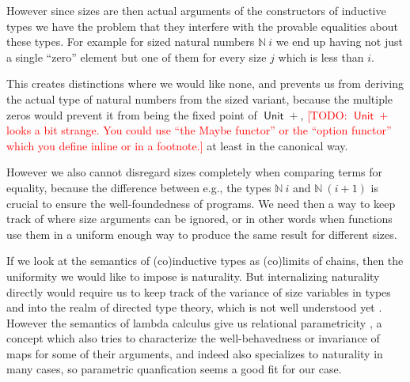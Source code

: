\documentclass{book}
\newcommand{\TODO}[1]{\textcolor{red}{[TODO: #1]}}
\DeclareMathOperator{\Unit}{\mathsf{Unit}}
\newcommand{\sNat}{\mathbb{N}}
\begin{document}
However since sizes are then actual arguments of the constructors of
inductive types we have the problem that they interfere with the
provable equalities about these types. For example for sized natural
numbers $\sNat~i$ we end up having not just a single ``zero'' element
but one of them for every size $j$ which is less than $i$.

This creates distinctions where we would like none, and prevents us
from deriving the actual type of natural numbers from the sized
variant, because the multiple zeros would prevent it from being the
fixed point of $\Unit +$,
\TODO{$\Unit +$ looks a bit strange.  You could use
``the Maybe functor'' or the ``option functor'' which you define
inline or in a footnote.}
at least in the canonical way.

However we also cannot disregard sizes completely when comparing terms
for equality, because the difference between e.g., the types $\sNat~i$ and
$\sNat~(i+1)$ is crucial to ensure the well-foundedness of programs.
We need then a way to keep track of where size arguments can be
ignored, or in other words when functions use them in a uniform enough
way to produce the same result for different sizes.

If we look at the semantics of (co)inductive types as (co)limits of
chains, then the uniformity we would like to impose is naturality. But
internalizing naturality directly would require us to keep track of
the variance of size variables in types and into the realm of directed
type theory, which is not well understood yet \cite{licataHarper:mfps11,
  riehlShulman:typeTheoryInfinityCategories}. However the semantics of lambda calculus give us
relational parametricity \cite{reynolds:ifip83}, a concept which also
tries to characterize the well-behavedness or invariance of maps for
some of their arguments, and indeed also specializes to naturality in
many cases, so parametric quanfication seems a good fit for our
case.
\end{document}
